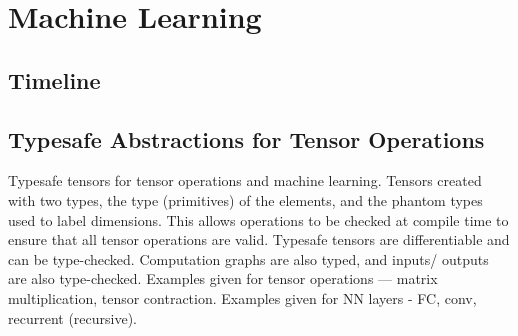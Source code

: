 \chapter {Machine Learning}

\section{Timeline}


\section {Typesafe Abstractions for Tensor Operations \cite{chen2017typesafe}}
Typesafe tensors for tensor operations and machine learning. Tensors created
with two types, the type (primitives) of the elements, and the phantom types
used to label dimensions. This allows operations to be checked at compile time
to ensure that all tensor operations are valid. Typesafe tensors are
differentiable and can be type-checked. Computation graphs are also typed, and
inputs/ outputs are also type-checked. Examples given for tensor operations ---
matrix multiplication, tensor contraction. Examples given for NN layers - FC,
conv, recurrent (recursive).
